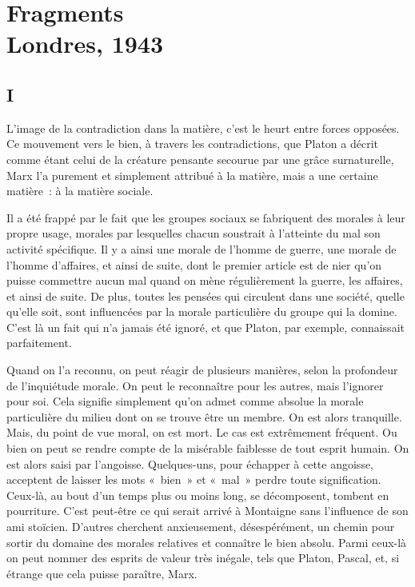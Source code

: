 \documentclass[french,twoside]{book} %
\begin{document}
\begin{center}
\noindent \centerline{}
\end{center}

\section[{Fragments. Londres, 1943}]{Fragments \\
Londres, 1943}\renewcommand{\leftmark}{Fragments \\
Londres, 1943}

\noindent \par
\subsection[{I}]{I}
\noindent L'image de la contradiction dans la matière, c'est le heurt entre forces opposées. Ce mouvement vers le bien, à travers les contradictions, que Platon a décrit comme étant celui de la créature pensante secourue par une grâce surnaturelle, Marx l'a purement et simplement attribué à la matière, mais a une certaine matière : à la matière sociale.\par
Il a été frappé par le fait que les groupes sociaux se fabriquent des morales à leur propre usage, morales par lesquelles chacun soustrait à l'atteinte du mal son activité spécifique. Il y a ainsi une morale de l'homme de guerre, une morale de l'homme d'affaires, et ainsi de suite, dont le premier article est de nier qu'on puisse commettre aucun mal quand on mène régulièrement la guerre, les affaires, et ainsi de suite. De plus, toutes les pensées qui circulent dans une société, quelle qu'elle soit, sont influencées par la morale particulière du groupe qui la domine. C'est là un fait qui n'a jamais été ignoré, et que Platon, par exemple, connaissait parfaitement.\par
Quand on l'a reconnu, on peut réagir de plusieurs manières, selon la profondeur de l'inquiétude morale. On peut le reconnaître pour les autres, mais l'ignorer pour soi. Cela signifie simplement qu'on admet comme absolue la morale particulière du milieu dont on se trouve être un membre. On est alors tranquille. Mais, du point de vue moral, on est mort. Le cas est extrêmement fréquent. Ou bien on peut se rendre compte de la misérable faiblesse de tout esprit humain. On est alors saisi par l'angoisse. Quelques-uns, pour échapper à cette angoisse, acceptent de laisser les mots « bien » et « mal » perdre toute signification. Ceux-là, au bout d'un temps plus ou moins long, se décomposent, tombent en pourriture. C'est peut-être ce qui serait arrivé à Montaigne sans l'influence de son ami stoïcien. D'autres cherchent anxieusement, désespérément, un chemin pour sortir du domaine des morales relatives et connaître le bien absolu. Parmi ceux-là on peut nommer des esprits de valeur très inégale, tels que Platon, Pascal, et, si étrange que cela puisse paraître, Marx.\par
\end{document}
